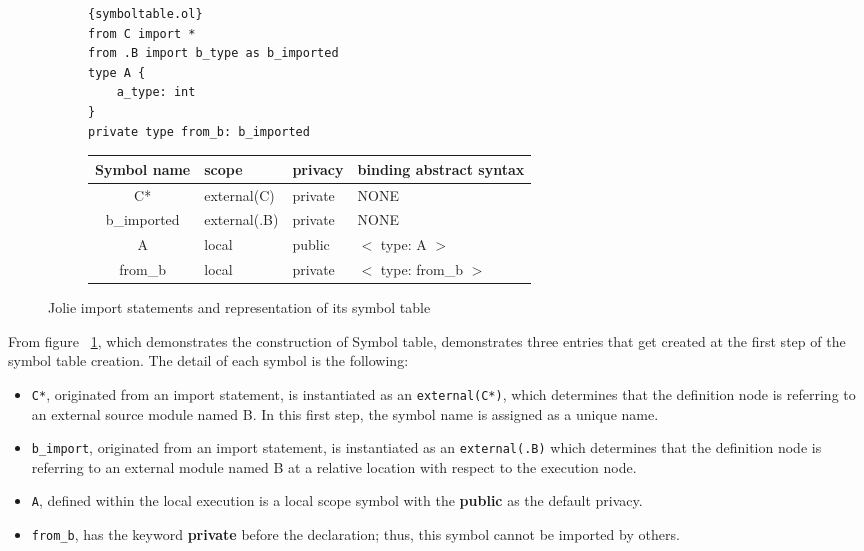 \begin{figure}[ht]
    \begin{subfigure}[b]{\textwidth}
        \lstset{language=Jolie,
            style=codeStyle,
            numbers=left,
            firstnumber=1
        }
        \begin{lstlisting}[frame=tlrb]{symboltable.ol}
from C import *
from .B import b_type as b_imported
type A {
    a_type: int
}
private type from_b: b_imported
\end{lstlisting}
    \end{subfigure}
    \begin{subfigure}[b]{\textwidth}
        \begin{tabular}{ |c|l|l|l| }
            \hline
            Symbol name & scope        & privacy & binding abstract syntax \\
            \hline
            C*          & external(C)  & private & NONE                    \\
            b_imported  & external(.B) & private & NONE                    \\
            A           & local        & public  & $<$ type: A $>$         \\
            from_b      & local        & private & $<$ type: from_b $>$    \\
            \hline
        \end{tabular}
    \end{subfigure}
    \caption{Jolie import statements and representation of its symbol table}
    \label{fig:jolie-ex-symbol-table}
\end{figure}

From figure ~\ref{fig:jolie-ex-symbol-table}, which demonstrates the construction of Symbol table, demonstrates three entries that get created at the first step of the symbol table creation. The detail of each symbol is the following:

\begin{itemize}
    \item \texttt{C*}, originated from an import statement, is instantiated as an \texttt{external(C*)}, which determines that the definition node is referring to an external source module named B. In this first step, the symbol name is assigned as a unique name.
    \item \texttt{b_import}, originated from an import statement, is instantiated as an \texttt{external(.B)} which determines that the definition node is referring to an external module named B at a relative location with respect to the execution node.
    \item \texttt{A}, defined within the local execution is a local scope symbol with the \textbf{public} as the default privacy.
    \item \texttt{from_b}, has the keyword \textbf{private} before the declaration; thus, this symbol cannot be imported by others.
\end{itemize}


